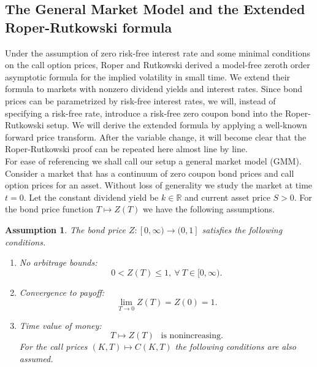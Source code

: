 \documentclass[a4 paper, 12pt]{report}
\theoremstyle{plain}
\newtheorem{assumption}[theorem]{\textbf{Assumption}}
\begin{document}
\subsection*{The General Market Model and the Extended Roper-Rutkowski formula}
\noindent
\par Under the assumption of zero risk-free interest rate and some minimal conditions on the
call option prices, Roper and Rutkowski derived a model-free zeroth order asymptotic formula for the implied volatility in small time. We extend their formula to markets with nonzero dividend yields and interest rates. Since bond prices can be parametrized by risk-free interest rates, we will,
instead of specifying a risk-free rate, introduce a risk-free zero coupon bond into the Roper-Rutkowski setup. We will derive the extended formula by applying a well-known forward
price transform. After the variable change, it will become clear that the Roper-Rutkowski
proof can be repeated here almost line by line.\\ %
For ease of referencing we shall call our setup a general market model (GMM). Consider
a market that has a continuum of zero coupon bond prices and call option prices for an asset.
Without loss of generality we study the market at time $t = 0$.  Let the constant dividend
yield be $k\in\mathbb{R}$ and current asset price $S > 0$. For the bond price function $T \mapsto Z(T)$ we
have the following assumptions.
\begin{assumption}\cite[pg.~10]{guo2011small}\label{as1}
The bond price $Z:[0,\infty)\rightarrow (0,1]$ satisfies the following conditions.
\begin{enumerate}
\item[(Z1)] No arbitrage bounds:
\begin{equation}\label{neww13}
0<Z(T)\leq 1,~\forall~ T\in [0,\infty).
\end{equation}
\item[(Z2)] Convergence to payoff:
\begin{equation}\label{neww14}
\lim_{T\rightarrow 0}Z(T) = Z(0) = 1.
\end{equation}
\item[(Z3)] Time value of money:
\begin{equation}\label{neww15}
T\mapsto Z(T)~~\mbox{   is nonincreasing}. 
\end{equation}
For the call prices $(K,T)\mapsto C(K,T)$ the following conditions are also assumed.
\end{enumerate}
\end{assumption}
\end{document}
